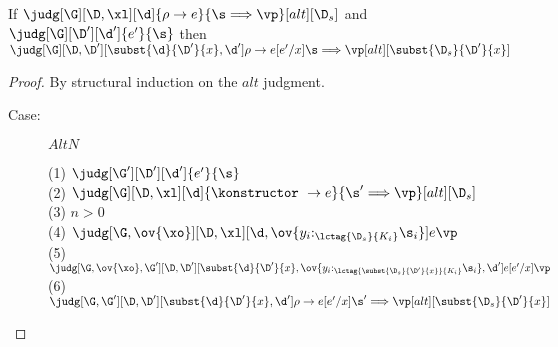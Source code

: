 \begin{sublemma}
  If $\judg[\G][\D,\xl][\d]{\rho\to e}{\s \Longrightarrow \vp}[alt][\D_s]$ and
    $\judg[\G][\D'][\d']{e'}{\s}$ then
    $\judg[\G][\D,\D'][\subst{\d}{\D'}{x},\d']{\rho \to e[e'/x]}{\s \Longrightarrow \vp}[alt][\subst{\D_s}{\D'}{x}]$
\end{sublemma}

\begin{proof}
By structural induction on the $alt$ judgment.

\begin{description}
\item[Case:] $AltN$
\begin{tabbing}
  (1) $\judg[\G'][\D'][\d']{e'}{\s}$\\
  (2) $\judg[\G][\D,\xl][\d]{\konstructor~\to e}{\s' \Longrightarrow \vp}[alt][\D_s]$\\
  (3) $n > 0$\\
  (4) $\judg[\G,\ov{\xo}][\D,\xl][\d,\ov{y_i{:}_{\lctag{\D_s}{K_i}}\s_i}]{e}{\vp}$\\
  (5) $\judg[\G,\ov{\xo}, \G'][\D,\D'][\subst{\d}{\D'}{x},\ov{y_i{:}_{\lctag{\subst{\D_s}{\D'}{x}}{K_i}}\s_i},\d']{e[e'/x]}{\vp}$\\
  (6) $\judg[\G,\G'][\D,\D'][\subst{\d}{\D'}{x},\d']{\rho \to e[e'/x]}{\s' \Longrightarrow \vp}[alt][\subst{\D_s}{\D'}{x}]$\\
\end{tabbing}


\end{description}
\end{proof}
